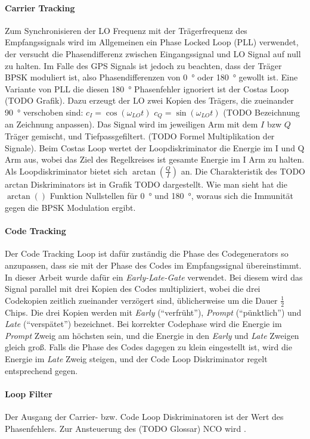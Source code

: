 \paragraph{Carrier Tracking}
Zum Synchronisieren der LO Frequenz mit der Trägerfrequenz des Empfangssignals wird im Allgemeinen ein Phase Locked Loop (PLL) verwendet, der versucht die Phasendifferenz zwischen Eingangssignal und LO Signal auf null zu halten. Im Falle des GPS Signals ist jedoch zu beachten, dass der Träger BPSK moduliert ist, also Phasendifferenzen von \SI{0}{\degree} oder \SI{180}{\degree} gewollt ist. Eine Variante von PLL die diesen \SI{180}{\degree} Phasenfehler ignoriert ist der Costas Loop (TODO Grafik).
Dazu erzeugt der LO zwei Kopien des Trägers, die zueinander \SI{90}{\degree} verschoben sind: $c_I=\cos(\omega_{LO} t)$ $c_Q=\sin(\omega_{LO} t)$ (TODO Bezeichnung an Zeichnung anpassen). Das Signal wird im jeweiligen Arm mit dem $I$ bzw $Q$ Träger gemischt, und Tiefpassgefiltert. (TODO Formel Multiplikation der Signale). Beim Costas Loop wertet der Loopdiskriminator die Energie im I und Q Arm aus, wobei das Ziel des Regelkreises ist gesamte Energie im I Arm zu halten. Als Loopdiskriminator bietet sich $\arctan\left(\frac{Q}{I}\right)$ an. Die Charakteristik des TODO arctan Diskriminators ist in Grafik TODO dargestellt. Wie man sieht hat die $\arctan()$ Funktion Nullstellen für \SI{0}{\degree} und \SI{180}{\degree}, woraus sich die Immunität gegen die BPSK Modulation ergibt.

\paragraph{Code Tracking}
Der Code Tracking Loop ist dafür zuständig die Phase des Codegenerators so anzupassen, dass sie mit der Phase des Codes im Empfangssignal übereinstimmt. In dieser Arbeit wurde dafür ein \emph{Early-Late-Gate} verwendet. Bei diesem wird das Signal parallel mit drei Kopien des Codes multipliziert, wobei die drei Codekopien zeitlich zueinander verzögert sind, üblicherweise um die Dauer $\frac{1}{2}$ Chips. Die drei Kopien werden mit \emph{Early} (\enquote{verfrüht}), \emph{Prompt} (\enquote{pünktlich}) und \emph{Late} (\enquote{verspätet}) bezeichnet. Bei korrekter Codephase wird die Energie im \emph{Prompt} Zweig am höchsten sein, und die Energie in den \emph{Early} und \emph{Late} Zweigen gleich groß. Falls die Phase des Codes dagegen zu klein eingestellt ist, wird die Energie im \emph{Late} Zweig steigen, und der Code Loop Diskriminator regelt entsprechend gegen.

\paragraph{Loop Filter}
Der Ausgang der Carrier- bzw. Code Loop Diskriminatoren ist der Wert des Phasenfehlers. Zur Ansteuerung des (TODO Glossar) NCO wird .